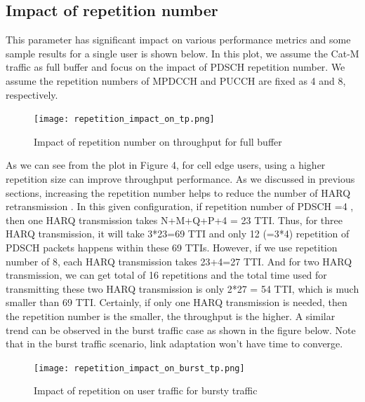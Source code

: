 \documentclass[conference,compsoc]{IEEEtran}
\begin{document}
\subsection{Impact of repetition number}
This parameter has significant impact on various performance metrics and some sample results for a single user is shown below. In this plot, we assume the Cat-M traffic as full buffer and focus on the impact of PDSCH repetition number. We assume the repetition numbers of MPDCCH and PUCCH are fixed as 4 and 8, respectively.

\begin{figure}[htbp]
\centerline{\texttt{[image: repetition\_impact\_on\_tp.png]}}
\caption{Impact of repetition number on throughput for full buffer}
\label{fig_rep_fb}
\end{figure}



As we can see from the plot in Figure 4, for cell edge users, using a higher repetition size can improve throughput performance. As we discussed in previous sections, increasing the repetition number helps to reduce the number of HARQ retransmission   . In this given configuration, if repetition number of PDSCH =4 , then one HARQ transmission takes N+M+Q+P+4 = 23 TTI. Thus, for three HARQ transmission, it will take 3*23=69 TTI and only 12 (=3*4) repetition of PDSCH packets happens within these 69 TTIs. However, if we use repetition number of  8, each HARQ transmission takes 23+4=27 TTI. And for two HARQ transmission, we can get total of 16 repetitions and the total time used for transmitting these two HARQ transmission is only 2*27 = 54 TTI, which is much smaller than 69 TTI. Certainly, if only one HARQ transmission is needed, then the repetition number is the smaller, the throughput is the higher.
A similar trend can be observed in the burst traffic case as shown in the figure below. Note that in the burst traffic scenario, link adaptation won’t have time to converge.

\begin{figure}[htbp]
\centerline{\texttt{[image: repetition\_impact\_on\_burst\_tp.png]}}
\caption{Impact of repetition on user traffic for bursty traffic}
\label{fig_rep_burst}
\end{figure}
\end{document}
